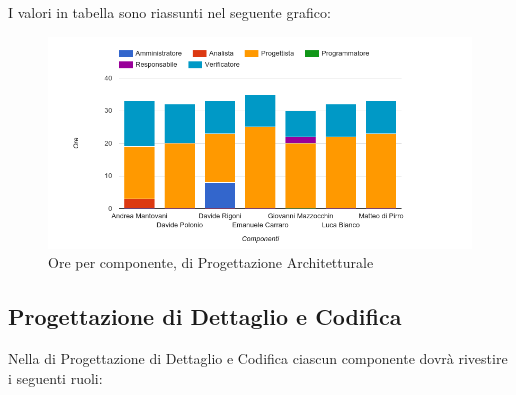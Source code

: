 I valori in tabella sono riassunti nel seguente grafico: \\ 

    \begin{figure}[H]
      \begin{center}
        \includegraphics[width=15cm]{res/img/suddivisioneRuoloProspettoOrario/orePerComponenteProgettazioneArchitetturale.png}
      \caption{Ore per componente,  di Progettazione Architetturale}
      \end{center} 
    \end{figure}    
    
    
    
    
\pagebreak
\subsection{Progettazione di Dettaglio e Codifica}
Nella  di Progettazione di Dettaglio e Codifica ciascun componente dovrà rivestire i seguenti ruoli:

